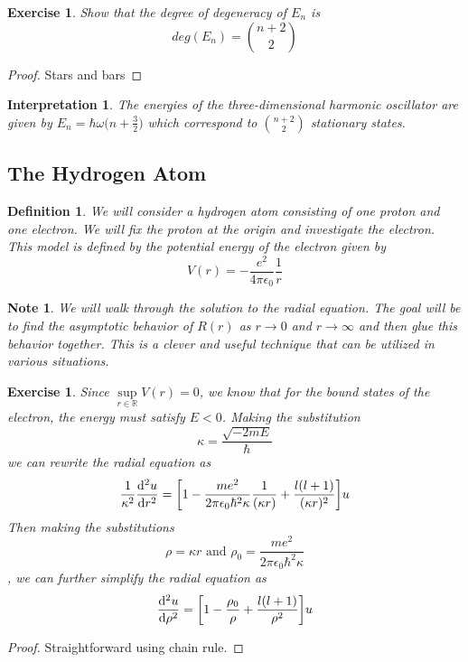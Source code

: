 \documentclass[12pt]{amsart}
\newtheorem{defn}[thm]{Definition}
\newtheorem{intp}[thm]{Interpretation}
\newtheorem{note}[thm]{Note}
\newtheorem{ex}[thm]{Exercise}
\newcommand{\ep}{\epsilon}
\newcommand{\om}{\omega}
\newcommand{\R}{\mathbb{R}}
\begin{document}
\begin{ex}
Show that the degree of degeneracy of $E_n$ is $$deg(E_n) = {n+2 \choose 2}$$
\end{ex}

\begin{proof}
Stars and bars
\end{proof}

\begin{intp}
The energies of the three-dimensional harmonic oscillator are given by $E_n = \hbar \om \bigg( n + \frac{3}{2}\bigg)$ which correspond to $ n+2 \choose 2$ stationary states.
\end{intp}


\subsection{The Hydrogen Atom}

\begin{defn}
We will consider a hydrogen atom consisting of one proton and one electron. We will fix the proton at the origin and investigate the electron. This model is defined by the potential energy of the electron given by $$V(r) = -\frac{e^2}{4\pi \ep_0}\frac{1}{r}$$
\end{defn}

\begin{note}
We will walk through the solution to the radial equation. The goal will be to find the asymptotic behavior of $R(r)$ as $r \rightarrow 0$ and $r \rightarrow \infty$ and then glue this behavior together. This is a clever and useful technique that can be utilized in various situations. 
\end{note}

\begin{ex}
Since $\sup\limits_{r \in \R} V(r) = 0$, we know that for the bound states of the electron, the energy must satisfy $E < 0$. Making the substitution $$\kappa = \frac{\sqrt{-2mE}}{\hbar}$$ we can rewrite the radial equation as $$\frac{1}{\kappa^2}\dv[2]{u}{r} = \bigg[1 - \frac{me^2}{2\pi\ep_0 \hbar^2 \kappa} \frac{1}{(\kappa r)} + \frac{l(l+1)}{(\kappa r)^2}\bigg]u$$ Then making the substitutions $$\rho = \kappa r \text{ and } \rho_0 = \frac{me^2}{2\pi\ep_0 \hbar^2 \kappa}$$, we can further simplify the radial equation as $$\dv[2]{u}{\rho} = \bigg[ 1 - \frac{\rho_0}{\rho} + \frac{l(l+1)}{\rho^2} \bigg]u$$
\end{ex}

\begin{proof}
Straightforward using chain rule.
\end{proof}
\end{document}
